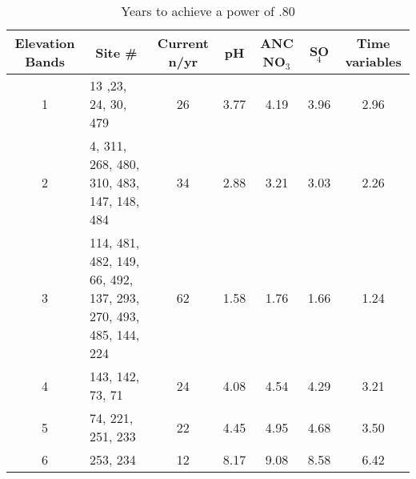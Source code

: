 \begin{table}[htbp]
\caption{Years to achieve a power of .80}
\begin{tabular}{clccccc}
\toprule
\multicolumn{1}{p{1.5cm}}{Elevation Bands} & \multicolumn{1}{c}{Site \#} & \multicolumn{1}{p{1.5cm}}{Current n/yr} & \multicolumn{1}{p{1cm}}{pH} &\multicolumn{1}{p{1cm}}{ ANC NO$_3$} & SO$_4$ & \multicolumn{1}{p{2.2cm}}{Time variables} \\  
\midrule
1 & 13 ,23, 24, 30, 479 & 26 & 3.77  & 4.19  & 3.96  & 2.96  \\ 
2 & \multicolumn{1}{p{4cm}}{4, 311, 268, 480, 310, 483, 147, 148, 484} & 34 & 2.88  & 3.21  & 3.03  & 2.26  \\ 
3 & \multicolumn{ 1}{p{4cm}}{114, 481, 482, 149, 66, 492, 137, 293, 270, 493, 485, 144, 224} & \multicolumn{ 1}{c}{62} & \multicolumn{ 1}{c}{1.58 } & \multicolumn{ 1}{c}{1.76 } & \multicolumn{ 1}{c}{1.66 } & \multicolumn{ 1}{c}{1.24} \\ 
4 & 143, 142, 73, 71 & 24 & 4.08  & 4.54  & 4.29  & 3.21  \\ 
5 & 74, 221, 251, 233 & 22 & 4.45  & 4.95  & 4.68  & 3.50  \\ 
6 & 253, 234 & 12 & 8.17  & 9.08  & 8.58  & 6.42  \\  
\bottomrule
\end{tabular}
\label{tab:currentyrsto.80}
\end{table}
